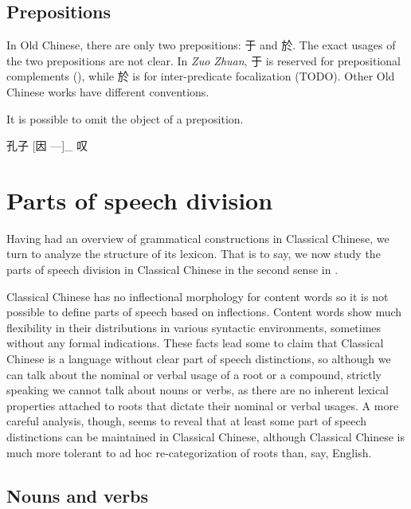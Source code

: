 \documentclass[UTF8, a4paper, oneside, scheme=plain, 12pt]{ctexrep}
\newcommand{\work}[1]{\textit{#1}}
\begin{document}
\subsection{Prepositions}

In Old Chinese, there are only two prepositions: 于 and 於.
The exact usages of the two prepositions are not clear.
In \work{Zuo Zhuan}, 于 is reserved for prepositional complements (),
while 於 is for inter-predicate focalization (TODO).
Other Old Chinese works have different conventions. 

It is possible to omit the object of a preposition.

\begin{exe}
    \ex 孔子 [因 ---]_{} 叹
\end{exe}

\section{Parts of speech division}\label{sec:grammatical.pos}

Having had an overview of grammatical constructions in Classical Chinese,
we turn to analyze the structure of its lexicon.
That is to say, we now study the parts of speech division in Classical Chinese
in the second sense in .

Classical Chinese has no inflectional morphology for content words 
so it is not possible to define parts of speech based on inflections.
Content words show much flexibility 
in their distributions in various syntactic environments,
sometimes without any formal indications.
These facts lead some to claim that Classical Chinese 
is a language without clear part of speech distinctions,
so although we can talk about the nominal or verbal usage of a root or a compound,
strictly speaking we cannot talk about nouns or verbs,
as there are no inherent lexical properties attached to roots
that dictate their nominal or verbal usages. 
A more careful analysis, though, seems to reveal that
at least some part of speech distinctions 
can be maintained in Classical Chinese,
although Classical Chinese is much more tolerant to ad hoc re-categorization of roots than, say, English.

\subsection{Nouns and verbs}
\end{document}
